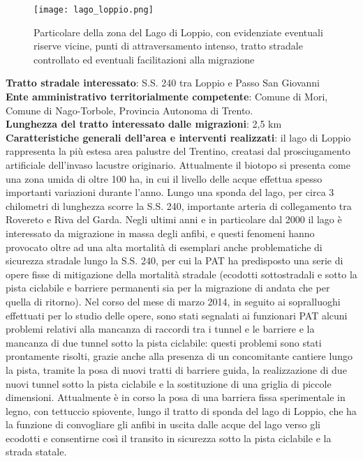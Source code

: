 \documentclass[11pt,a4paper,twoside]{memoir}
\begin{document}
\begin{figure}[H]
\label{fig:map_loppio}
\centering
  \texttt{[image: lago\_loppio.png]}
\caption{Particolare della zona del Lago di Loppio, con evidenziate eventuali riserve vicine, punti di attraversamento intenso, tratto stradale controllato ed eventuali facilitazioni alla migrazione}
\end{figure}

\textbf{Tratto stradale interessato}: S.S. 240 tra Loppio e Passo San Giovanni \\
\textbf{Ente amministrativo territorialmente competente}: Comune di Mori, Comune di Nago-Torbole, Provincia Autonoma di Trento. \\
\textbf{Lunghezza del tratto interessato dalle migrazioni}: 2,5 km \\
\textbf{Caratteristiche generali dell’area e interventi realizzati}: il lago di Loppio rappresenta la più estesa area palustre del Trentino, creatasi dal prosciugamento artificiale dell'invaso lacustre originario. Attualmente il biotopo si presenta come una zona umida di oltre 100 ha, in cui il livello delle acque effettua spesso importanti variazioni durante l'anno. Lungo una sponda del lago, per circa 3 chilometri di lunghezza scorre la S.S. 240, importante arteria di collegamento tra Rovereto e Riva del Garda. Negli ultimi anni e in particolare dal 2000 il lago è interessato da migrazione in massa degli anfibi, e questi fenomeni hanno provocato oltre ad una alta mortalità di esemplari anche problematiche di sicurezza stradale lungo la S.S. 240, per cui la PAT ha predisposto una serie di opere fisse di mitigazione della mortalità stradale (ecodotti sottostradali e sotto la pista ciclabile e barriere permanenti sia per la migrazione di andata che per quella di ritorno). Nel corso del mese di marzo 2014, in seguito ai sopralluoghi effettuati per lo studio delle opere, sono stati segnalati ai funzionari PAT alcuni problemi relativi alla mancanza di raccordi tra i tunnel e le barriere e la mancanza di due tunnel sotto la pista ciclabile: questi problemi sono stati prontamente risolti, grazie anche alla presenza di un concomitante cantiere lungo la pista, tramite la posa di nuovi tratti di barriere guida, la realizzazione di due nuovi tunnel sotto la pista ciclabile e la sostituzione di una griglia di piccole dimensioni. Attualmente è in corso la posa di una barriera fissa sperimentale in legno, con tettuccio spiovente, lungo il tratto di sponda del lago di Loppio, che ha la funzione di convogliare gli anfibi in uscita dalle acque del lago verso gli ecodotti e consentirne così il transito in sicurezza sotto la pista ciclabile e la strada statale. \\
\end{document}
